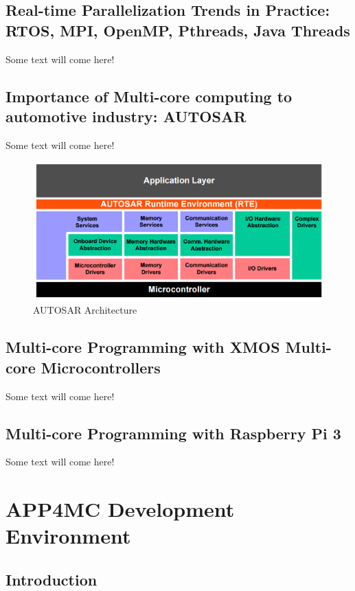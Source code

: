 \section{Real-time Parallelization Trends in Practice: RTOS, MPI, OpenMP, Pthreads, Java Threads} %
Some text will come here! \\
\section{Importance of Multi-core computing to automotive industry: AUTOSAR} %
Some text will come here! \\
\begin{figure}[!ht]
	\includegraphics[scale=0.35]{content/images/autosararch.png}
	\caption{AUTOSAR Architecture \cite{autosararch}}
	\label{fig:autosararch}
\end{figure}
\section{Multi-core Programming with XMOS Multi-core Microcontrollers}
Some text will come here! \\
\section{Multi-core Programming with Raspberry Pi 3}
Some text will come here! \\
\chapter{APP4MC Development Environment}
\section{Introduction} %
